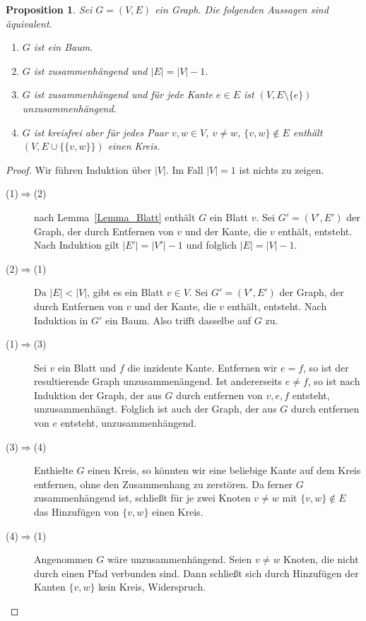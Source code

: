 \documentclass[10pt,reqno]{amsart}
\numberwithin{equation}{section}
\newtheorem{proposition}[definition]{Proposition}
\newcommand\Lem{Lemma}
\begin{document}
\begin{proposition}\label{Lemma_Baum}
Sei $G=(V,E)$ ein Graph.
Die folgenden Aussagen sind \"aquivalent.
\begin{enumerate}
\item $G$ ist ein Baum.
\item $G$ ist zusammenh\"angend und $|E|=|V|-1$.
\item $G$ ist zusammenh\"angend und f\"ur jede Kante $e\in E$ ist $(V,E\setminus\{e\})$ unzusammenh\"angend.
\item $G$ ist kreisfrei aber f\"ur jedes Paar $v,w\in V$, $v\neq w$, $\{v,w\}\not\in E$ enth\"alt $(V,E\cup\{\{v,w\}\})$ einen Kreis.
\end{enumerate}
\end{proposition}
\begin{proof}
Wir f\"uhren Induktion \"uber $|V|$.
Im Fall $|V|=1$ ist nichts zu zeigen.
\begin{description}
\item[(1)$\Rightarrow$(2)] nach \Lem~\ref{Lemma_Blatt} enth\"alt $G$ ein Blatt $v$.
	Sei $G'=(V',E')$ der Graph, der durch Entfernen von $v$ und der Kante, die $v$ enth\"alt, entsteht.
	Nach Induktion gilt $|E'|=|V'|-1$ und folglich $|E|=|V|-1$.
\item[(2)$\Rightarrow$(1)] Da $|E|<|V|$, gibt es ein Blatt $v\in V$.
	Sei $G'=(V',E')$ der Graph, der durch Entfernen von $v$ und der Kante, die $v$ enth\"alt, entsteht.
	Nach Induktion in $G'$ ein Baum.
	Also trifft dasselbe auf $G$ zu.
\item[(1)$\Rightarrow$(3)]
	Sei $v$ ein Blatt und $f$ die inzidente Kante.
	Entfernen wir $e=f$, so ist der resultierende Graph unzusammen\"angend.
	Ist andererseits $e\neq f$, so ist nach Induktion der Graph, der aus $G$ durch entfernen von $v,e,f$ entsteht, unzusammenh\"angt.
	Folglich ist auch der Graph, der aus $G$ durch entfernen von $e$ entsteht, unzusammenh\"angend.
\item[(3)$\Rightarrow$(4)] Enthielte $G$ einen Kreis, so k\"onnten wir eine beliebige Kante auf dem Kreis entfernen, ohne den
	Zusammenhang zu zerst\"oren.
	Da ferner $G$ zusammenh\"angend ist, schlie\ss t f\"ur je zwei Knoten $v\neq w$ mit $\{v,w\}\not\in E$ das Hinzuf\"ugen von $\{v,w\}$ einen Kreis.
\item[(4)$\Rightarrow$(1)]
	Angenommen $G$ w\"are unzusammenh\"angend.
	Seien $v\neq w$ Knoten, die nicht durch einen Pfad verbunden sind.
	Dann schlie\ss t sich durch Hinzuf\"ugen der Kanten $\{v,w\}$ kein Kreis, Widerspruch.
\end{description}
\end{proof}
\end{document}
